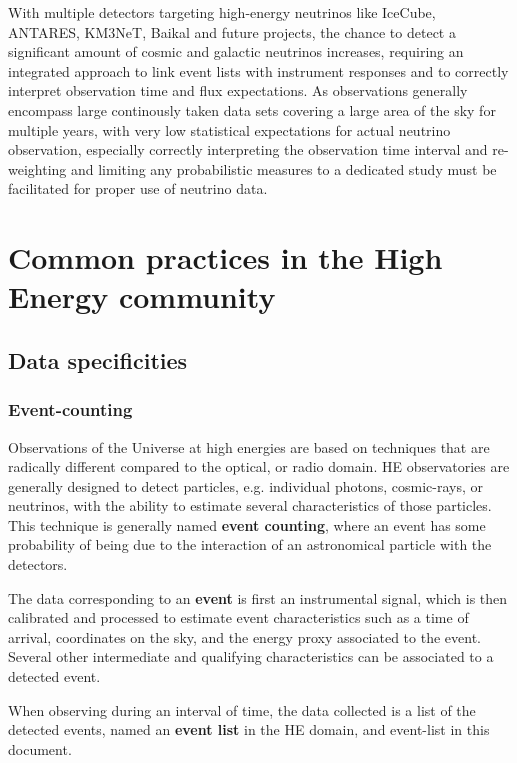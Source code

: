 \documentclass[11pt,a4paper]{ivoa}
\begin{document}
With multiple detectors targeting high-energy neutrinos like IceCube, ANTARES, KM3NeT, Baikal and future projects, the
chance to detect a significant amount of cosmic and galactic neutrinos increases, requiring an integrated approach to
link event lists with instrument responses and to correctly interpret observation time and flux expectations. As observations
generally encompass large continously taken data sets covering a large area of the sky for multiple years, with very low statistical
expectations for actual neutrino observation, especially correctly interpreting the observation time interval and re-weighting and limiting any probabilistic
measures to a dedicated study must be facilitated for proper use of neutrino data.


\section{Common practices in the High Energy community}
\label{sec:vhespec}

\subsection{Data specificities}

\subsubsection{Event-counting}

Observations of the Universe at high energies are based on techniques that are radically different compared to the optical, or radio domain. HE observatories are generally designed to detect particles, e.g. individual photons, cosmic-rays, or neutrinos, with the ability to estimate several characteristics of those particles. This technique is generally named \textbf{event counting}, where an event has some probability of being due to the interaction of an astronomical particle with the detectors.

The data corresponding to an \textbf{event} is first an instrumental signal, which is then calibrated and processed to estimate event characteristics such as a time of arrival, coordinates on the sky, and the energy proxy associated to the event. Several other intermediate and qualifying characteristics can be associated to a detected event.

When observing during an interval of time, the data collected is a list of the detected events, named an \textbf{event list} in the HE domain, and event-list in this document.
\end{document}

